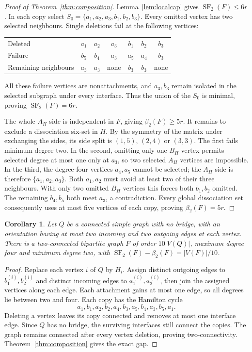 \documentclass[11pt]{article}
\newtheorem{corollary}[theorem]{Corollary}
\newcommand{\SF}{\operatorname{SF}_2}
\newcommand{\diss}{\beta_2}
\begin{document}
\begin{proof}[Proof of Theorem~\ref{thm:composition}]
Lemma~\ref{lem:localcap} gives $\SF(F)\le6r$. In each copy select
$S_0=\{a_1,a_2,a_3,b_1,b_2,b_3\}$. Every omitted vertex has two selected
neighbours. Single deletions fail at the following vertices:
\begin{center}
\begin{tabular}{@{}lcccccc@{}}
\toprule
Deleted & $a_1$ & $a_2$ & $a_3$ & $b_1$ & $b_2$ & $b_3$\\
Failure & $b_5$ & $b_4$ & $a_3$ & $a_5$ & $a_4$ & $b_3$\\
Remaining neighbours & $a_3$ & $a_3$ & none & $b_3$ & $b_3$ & none\\
\bottomrule
\end{tabular}
\end{center}
All these failure vertices are nonattachments, and $a_3,b_3$ remain
isolated in the selected subgraph under every interface. Thus the union
of the $S_0$ is minimal, proving $\SF(F)=6r$.

The whole $A_H$ side is independent in $F$, giving $\diss(F)\ge5r$.
It remains to exclude a dissociation six-set in $H$. By the symmetry
of the matrix under exchanging the sides, its side split is $(1,5)$,
$(2,4)$ or $(3,3)$. The first fails minimum degree two. In the second,
omitting only one $B_H$ vertex permits selected degree at most one only
at $a_3$, so two selected $A_H$ vertices are impossible. In the third,
the degree-four vertices $a_4,a_5$ cannot be selected; the $A_H$ side is
therefore $\{a_1,a_2,a_3\}$. Both $a_1,a_2$ must avoid at least two of
their three neighbours. With only two omitted $B_H$ vertices this forces
both $b_1,b_2$ omitted. The remaining $b_4,b_5$ both meet $a_3$, a
contradiction. Every global dissociation set consequently uses at most
five vertices of each copy, proving $\diss(F)=5r$.
\end{proof}

\begin{corollary}\label{cor:topology}
Let $Q$ be a connected simple graph with no bridge, with an orientation
having at most two incoming and two outgoing edges at each vertex.
There is a two-connected bipartite graph $F$ of order $10|V(Q)|$,
maximum degree four and minimum degree two, with
$\SF(F)-\diss(F)=|V(F)|/10$.
\end{corollary}
\begin{proof}
Replace each vertex $i$ of $Q$ by $H_i$. Assign distinct outgoing edges
to $b_1^{(i)},b_2^{(i)}$ and distinct incoming edges to
$a_1^{(i)},a_2^{(i)}$, then join the assigned vertices along each edge.
Each attachment gains at most one edge, so all degrees lie between two
and four. Each copy has the Hamilton cycle
\[
 a_1,b_1,a_2,b_2,a_4,b_3,a_5,b_4,a_3,b_5,a_1.
\]
Deleting a vertex leaves its copy connected and removes at most one
interface edge. Since $Q$ has no bridge, the surviving interfaces still
connect the copies. The graph remains connected after every vertex
deletion, proving two-connectivity. Theorem~\ref{thm:composition} gives
the exact gap.
\end{proof}
\end{document}
